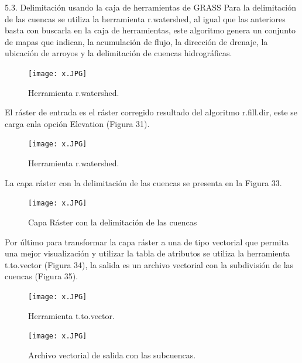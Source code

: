 \documentclass[12pt,hidelinks]{article}
\begin{document}
5.3. Delimitación usando la caja de herramientas de GRASS
Para la delimitación de las cuencas se utiliza la herramienta r.watershed, al igual que las anteriores basta con buscarla en la caja de herramientas, este algoritmo genera un conjunto de mapas que indican, la acumulación de flujo, la dirección de drenaje, la ubicación de arroyos y la delimitación de cuencas hidrográficas.
\begin{figure}[H]
    \centering
    \texttt{[image: x.JPG]}
    \caption{  Herramienta r.watershed.}
 \label{fig:my_label}
\end{figure}
El ráster de entrada es el ráster corregido resultado del algoritmo r.fill.dir, este se carga enla opción Elevation (Figura 31).
\begin{figure}[H]
    \centering
    \texttt{[image: x.JPG]}
    \caption{  Herramienta r.watershed.}
 \label{fig:my_label}
\end{figure}
La capa ráster con la delimitación de las cuencas se presenta en la Figura 33.
\begin{figure}[H]
    \centering
    \texttt{[image: x.JPG]}
    \caption{  Capa Ráster con la delimitación de las cuencas}
 \label{fig:my_label}
\end{figure}
Por último para transformar la capa ráster a una de tipo vectorial que permita una mejor visualización y utilizar la tabla de atributos se utiliza la herramienta t.to.vector (Figura 34), la salida es un archivo vectorial con la subdivisión de las cuencas (Figura 35).
\begin{figure}[H]
    \centering
    \texttt{[image: x.JPG]}
    \caption{ Herramienta t.to.vector.}
 \label{fig:my_label}
\end{figure}

\begin{figure}[H]
    \centering
    \texttt{[image: x.JPG]}
    \caption{  Archivo vectorial de salida con las subcuencas.}
 \label{fig:my_label}
\end{figure}
\end{document}
